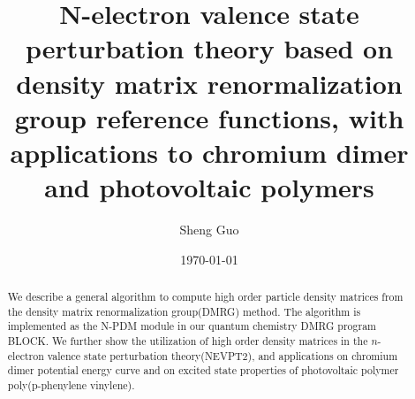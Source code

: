 \documentclass[
 aip,
 jmp,
 amsmath,
 amssymb,
 12pt, reprint, %
]{revtex4-1}
\begin{document}
\title{N-electron valence state perturbation theory based on density matrix renormalization group reference functions, with applications to chromium dimer and photovoltaic polymers}
\author{Sheng Guo}

\begin{abstract}
We describe a general algorithm to compute high order particle density matrices 
from the density matrix renormalization group(DMRG) method. The algorithm is implemented 
as the N-PDM module in our quantum chemistry DMRG program BLOCK\cite{sharma_spin-adapted_2012}.
We further show the utilization of high order 
density matrices in the $n$-electron valence state perturbation theory(NEVPT2), 
and applications on chromium dimer potential energy curve and on excited state properties of photovoltaic polymer poly(p-phenylene vinylene).

\end{abstract}

\date{\today}

\maketitle

















{}

\end{document}
